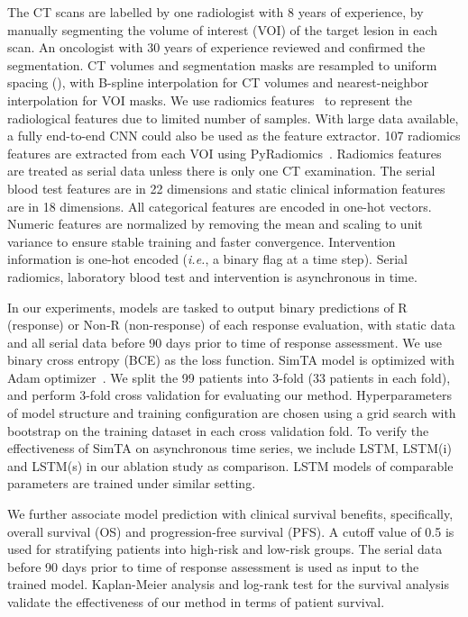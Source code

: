 \documentclass[runningheads]{llncs}
\newcommand{\ie}{\textit{i.e.}}
\begin{document}
The CT scans are labelled by one radiologist with 8 years of experience, by manually segmenting the volume of interest (VOI) of the target lesion in each scan. An oncologist with 30 years of experience reviewed and confirmed the segmentation. CT volumes and segmentation masks are resampled to uniform spacing (), with B-spline interpolation for CT volumes and nearest-neighbor interpolation for VOI masks. We use radiomics features~\cite{Gillies2016RadiomicsIA} to represent the radiological features due to limited number of samples. With large data available, a fully end-to-end CNN could also be used as the feature extractor. 107 radiomics features are extracted from each VOI using PyRadiomics~\cite{Griethuysen2017ComputationalRS}. Radiomics features are treated as serial data unless there is only one CT examination. The serial blood test features are in 22 dimensions and static clinical information features are in 18 dimensions. All categorical features are encoded in one-hot vectors. Numeric features are normalized by removing the mean and scaling to unit variance to ensure stable training and faster convergence. Intervention information is one-hot encoded (\ie, a binary flag at a time step). Serial radiomics, laboratory blood test and intervention is asynchronous in time.

In our experiments, models are tasked to output binary predictions of R (response) or Non-R (non-response) of each response evaluation, with static data and all serial data before 90 days prior to time of response assessment. We use binary cross entropy (BCE) as the loss function. SimTA model is optimized with Adam optimizer~\cite{Kingma2014AdamAM}. We split the 99 patients into 3-fold (33 patients in each fold), and perform 3-fold cross validation for evaluating our method. Hyperparameters of model structure and training configuration are chosen using a grid search with bootstrap on the training dataset in each cross validation fold. To verify the effectiveness of SimTA on asynchronous time series, we include LSTM, LSTM(i) and LSTM(s) in our ablation study as comparison. LSTM models of comparable parameters are trained under similar setting.

We further associate model prediction with clinical survival benefits, specifically, overall survival (OS) and progression-free survival (PFS). A cutoff value of 0.5 is used for stratifying patients into high-risk and low-risk groups. The serial data before 90 days prior to time of response assessment is used as input to the trained model. Kaplan-Meier analysis and log-rank test for the survival analysis validate the effectiveness of our method in terms of patient survival. 
\end{document}
